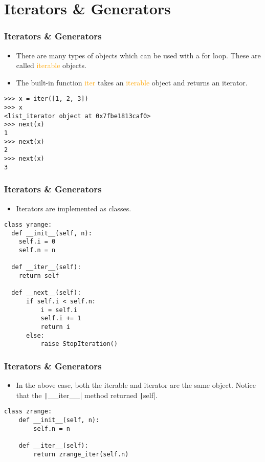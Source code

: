 \documentclass{../py-lecture}
\begin{document}
\section{Iterators \& Generators}

\begin{frame}[fragile]
	\frametitle{Iterators \& Generators}
  \begin{itemize}
    \item There are many types of objects which can be used with a for loop.
    These are called \textcolor{Orange}{iterable} objects.
    \item The built-in function \textcolor{Orange}{iter} takes an \textcolor{Orange}{iterable}
    object and returns an iterator.
  \end{itemize}
  \begin{verbatim}
>>> x = iter([1, 2, 3])
>>> x
<list_iterator object at 0x7fbe1813caf0>
>>> next(x)
1
>>> next(x)
2
>>> next(x)
3
  \end{verbatim}
\end{frame}

\begin{frame}[fragile]
	\frametitle{Iterators \& Generators}
  \begin{itemize}
    \item Iterators are implemented as classes.
  \end{itemize}
  \begin{verbatim}
class yrange:
  def __init__(self, n):
    self.i = 0
    self.n = n

  def __iter__(self):
    return self

  def __next__(self):
      if self.i < self.n:
          i = self.i
          self.i += 1
          return i
      else:
          raise StopIteration()
    \end{verbatim}
\end{frame}

\begin{frame}[fragile]
	\frametitle{Iterators \& Generators}
  \begin{itemize}
    \item In the above case, both the iterable and iterator are the same object. Notice that the \texttt|__iter__| method returned \texttt|self|.
  \end{itemize}
  \begin{verbatim}
class zrange:
    def __init__(self, n):
        self.n = n

    def __iter__(self):
        return zrange_iter(self.n)
  \end{verbatim}
\end{frame}
\end{document}
